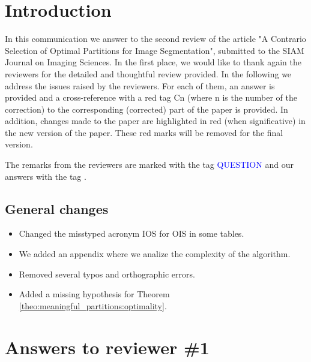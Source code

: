 \documentclass[a4paper,10pt]{report}
\title{}
\author{}
\begin{document}
\maketitle


\chapter{Introduction}
In this communication we answer to the second review of the article "A Contrario Selection of Optimal Partitions for Image Segmentation", submitted to the SIAM Journal on Imaging Sciences.
In the first place, we would like to thank again the reviewers for the detailed and thoughtful review provided. In the following we address the issues raised by the reviewers. 
For each of them, an answer is provided and a cross-reference with a red tag Cn (where n is the number of the correction) to the corresponding (corrected) part of the paper is provided. In addition, changes made to the paper are highlighted in red (when significative) in the new version of the paper. 
These red marks will be removed for the final version.

The remarks from the reviewers are marked with the tag \textcolor{blue}{QUESTION} and our answers with the tag \ans.

\section{General changes}
\begin{itemize}
 \item Changed the misstyped acronym IOS for OIS in some tables.
\item We added an appendix where we analize the complexity of the algorithm.
\item Removed several typos and orthographic errors.
\item Added a missing hypothesis for Theorem \ref{theo:meaningful_partitions:optimality}.
\end{itemize}


\chapter{Answers to reviewer \#1}
\end{document}
